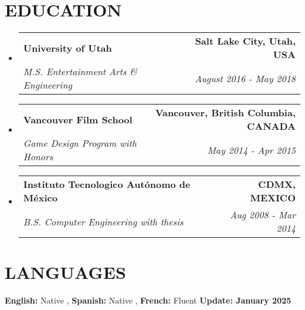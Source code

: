 \documentclass[letterpaper,11pt]{article}
\makeatletter
\newcommand{\resumeSubheading}[4]{
  \vspace{-5pt}\item
    \begin{tabular*}{1.0\textwidth}[t]{l@{\extracolsep{\fill}}r}
      \textbf{\large#1} & \textbf{\small #2} \\
      \textit{\large#3} & \textit{\small #4} \\
      
    \end{tabular*}\vspace{-7pt}
}
\newcommand{\resumeSubHeadingListStart}{\begin{itemize}[leftmargin=0.0in, label={}]}
\newcommand{\resumeSubHeadingListEnd}{\end{itemize}}
\makeatother
\begin{document}
\section{\color{airforceblue}EDUCATION}
\begin{adjustwidth}{.25in}{0in} %
\resumeSubHeadingListStart
  \resumeSubheading
    {University of Utah}{
      \hfill \small{Salt Lake City, Utah, USA} \hspace{14pt} %
    }
    {M.S. Entertainment Arts \& Engineering}{
      \hfill \small{August 2016 - May 2018} \hspace{14pt} %
    }
  \vspace{-4pt}
   \resumeSubheading
    {Vancouver Film School}{
      \hfill \small{Vancouver, British Columbia, CANADA} \hspace{14pt} %
    }
    {Game Design Program with Honors}{
      \hfill \small{May 2014 - Apr 2015} \hspace{14pt} %
    }
  \vspace{-4pt}
   \resumeSubheading
    {Instituto Tecnologico Autónomo de México}{
      \hfill \small{CDMX, MEXICO} \hspace{14pt} %
    }
    {B.S. Computer Engineering with thesis}{
      \hfill \small{Aug 2008 - Mar 2014} \hspace{14pt} %
    }
\resumeSubHeadingListEnd
\end{adjustwidth}
\vspace{-4pt}

\section{\color{airforceblue}LANGUAGES}
\begin{itemize}[leftmargin=0.25in, label={}]
  \small{\item{
   \textbf{\normalsize{English:}}{ \normalsize{Native}} ,
   \textbf{\normalsize{Spanish:}}{ \normalsize{Native}} ,
    \textbf{\normalsize{French:}}{ \normalsize{Fluent}}
    \hfill \small{\textbf{Update: January 2025}} %
   }}
\end{itemize}
\end{document}
